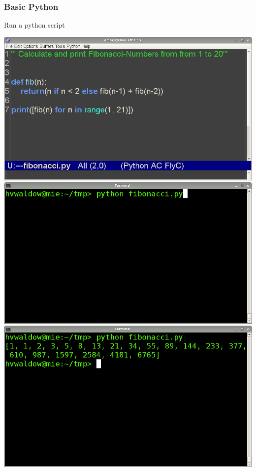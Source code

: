 \documentclass[xcolor=pdftex,dvipsnames,table]{beamer}
\begin{document}
\begin{frame}
  \frametitle{Basic Python}
  \begin{block}{Run a python script}
    \begin{overprint}
    \includegraphics[width=\textwidth]{runpy1.png}
    \includegraphics[width=\textwidth]{runpy2.png}
    \includegraphics[width=\textwidth]{runpy3.png}

\end{overprint}
\end{block}
\end{frame}
\end{document}
